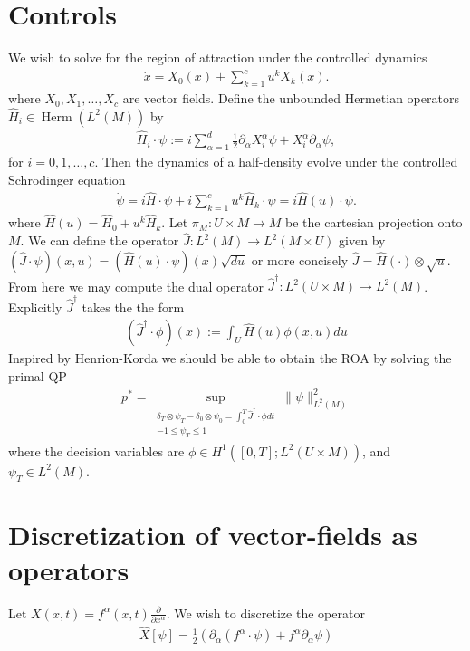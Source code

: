 \documentclass[12pt]{amsart}
\newcommand{\pder}[2]{\ensuremath{\frac{ \partial #1}{\partial #2}}}
\DeclareMathOperator{\Herm}{Herm}
\begin{document}
\section{Controls}
We wish to solve for the region of attraction under the controlled dynamics
\begin{align*}
	\dot{x} = X_0(x) + \sum_{k=1}^{c} u^k X_k(x).
\end{align*}
where $X_0,X_1,\dots,X_c$ are vector fields.
Define the unbounded Hermetian operators $\hat{H}_i \in \Herm(L^2(M) )$ by
\begin{align*}
	\hat{H}_i \cdot \psi := i \sum_{\alpha=1}^d   \frac{1}{2} \partial_\alpha X_i^\alpha  \psi + X_i^\alpha \partial_\alpha \psi,
\end{align*}
for $i=0,1,\dots,c$.
Then the dynamics of a half-density evolve under the controlled Schrodinger equation
\begin{align*}
	\dot{\psi} = i \hat{H} \cdot \psi + i \sum_{k=1}^c u^k \hat{H}_k \cdot \psi = i \hat{H}(u) \cdot \psi.
\end{align*}
where $\hat{H}(u) = \hat{H}_0 + u^k \hat{H}_k$.
Let $\pi_M : U \times M \to M$ be the cartesian projection onto $M$.
We can define the operator $\hat{J} : L^2(M) \to L^2(M \times U)$ given by $(\hat{J} \cdot \psi )(x,u)= (\hat{H}(u) \cdot \psi)(x) \sqrt{du}$
or more concisely $\hat{J} = \hat{H}(\cdot) \otimes \sqrt{u}$.
From here we may compute the dual operator $\hat{J}^\dagger : L^2( U \times M) \to L^2(M)$.
Explicitly $\hat{J}^\dagger$ takes the the form
\begin{align*}
	(\hat{J}^\dagger \cdot \phi )(x) :=  \int_U \hat{H}(u) \phi(x,u) du
\end{align*}
Inspired by Henrion-Korda we should be able to obtain the ROA by solving the primal QP
\begin{align*}
	p^* = \sup_{
		\substack{ \delta_T \otimes \psi_T - \delta_0 \otimes \psi_0 = \int_{0}^T \hat{J}^\dagger \cdot \phi dt \\ -1 \leq \psi_T \leq 1  }}
			 \| \psi \|_{L^2(M)}^2
\end{align*}
where the decision variables are $\phi \in H^1( [0,T] ; L^2(U \times M) )$, and $\psi_T  \in L^2(M)$.

\section{Discretization of vector-fields as operators}
\label{sec:discretization of vector-fields}
Let $X (x,t)= f^\alpha(x,t) \pder{}{x^\alpha}$.
We wish to discretize the operator
\begin{align*}
	\widehat{X}[\psi] = \frac{1}{2} \left(  \partial_\alpha( f^\alpha \cdot \psi) + f^\alpha \partial_\alpha \psi \right)
\end{align*}
\end{document}
